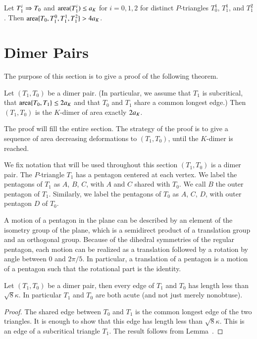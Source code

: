 \begin{lemma}
Let $T_1^i\Rightarrow T_0$ and ${\operatorname{area}}(T_1^i)\le a_K$ for $i=0,1,2$ for distinct $P$-triangles $T^1_0$, $T^1_1$, and $T^2_1$.
Then ${\operatorname{area}}\{T_0,T^0_1,T^1_1,T^2_1\} > 4a_K$.
\end{lemma}


\section{Dimer Pairs}

The purpose of this section is to give a proof of the following theorem.  


\begin{theorem}
Let $(T_1,T_0)$ be a dimer pair.  (In particular, we assume that $T_1$ is subcritical,
that ${\operatorname{area}}\{T_0,T_1\}\le 2a_K$ and that $T_0$ and $T_1$ share a common longest edge.)
Then $(T_1,T_0)$ is the $K$-dimer of area exactly $2a_K$.
\end{theorem}

The proof will fill the entire section.
 The strategy
of the proof is to give a sequence of area decreasing deformations to $(T_1,T_0)$,
until the $K$-dimer is reached.

We fix notation that will be used throughout this section $(T_1,T_0)$ is a dimer pair.
The $P$-triangle $T_1$ has a pentagon centered at each vertex.  We label the pentagons of $T_1$ as
$A$, $B$, $C$, with $A$ and $C$ shared with $T_0$.  We call $B$ the outer pentagon of $T_1$.
Similarly, we label the pentagons of $T_0$ as $A$, $C$, $D$, with outer pentagon $D$ of $T_0$.

A motion of a pentagon in the plane can be described by an element of the isometry group of
the plane, which is a semidirect product of a translation group and an orthogonal group.  
Because of the dihedral
symmetries of the regular pentagon, each motion can be realized as a translation followed
by a rotation by angle between $0$ and $2\pi/5$.   In particular, a translation of a pentagon is a motion of
a pentagon such that the rotational part is the identity.

\begin{lemma}  Let $(T_1,T_0)$ be a dimer pair, then every edge of $T_1$ and $T_0$ has length
less than $\sqrt8\kappa$.  In particular $T_1$ and $T_0$ are both acute (and not just merely nonobtuse).
\end{lemma}

\begin{proof}  The shared edge between $T_0$ and $T_1$ is the common longest edge of the
two triangles.  It is enough to show that this edge has length less than $\sqrt8\kappa$.
This is an edge of a subcritical triangle $T_1$. The result follows from Lemma~.
\end{proof}

